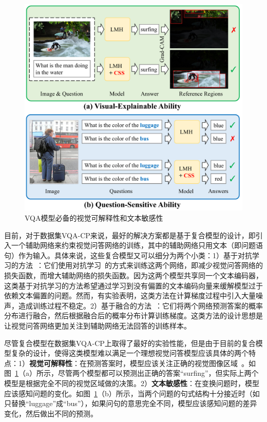 \begin{figure}[t]
    \centering
        \includegraphics[width=0.8\linewidth]{chapter7/res/motivation.pdf}
    \caption{VQA模型必备的视觉可解释性和文本敏感性}
    \label{ch7:fig:motivation}
\end{figure}

目前，对于数据集VQA-CP来说，最好的解决方案都是基于复合模型的设计，即引入一个辅助网络来约束视觉问答网络的训练，其中的辅助网络只用文本（即问题语句）作为输入。具体来说，这些复合模型又可以细分为两个小类：1）基于对抗学习的方法~\cite{ramakrishnan2018overcoming,grand2019adversarial,belinkov2019don}：它们使用对抗学习~\cite{goodfellow2014generative}的方式来训练这两个网络，即减少视觉问答网络的损失函数，而增大辅助网络的损失函数。因为这两个模型共享同一个文本编码器，这类基于对抗学习的方法希望通过学习到没有偏置的文本编码向量来缓解模型过于依赖文本偏置的问题。然而，有实验表明，这类方法在计算梯度过程中引入大量噪声，造成训练过程不稳定。2）基于融合的方法~\cite{cadene2019rubi,clark2019don,mahabadi2019simple}：它们将两个网络预测答案的概率分布进行融合，然后根据融合后的概率分布计算训练梯度。这类方法的设计思想是让视觉问答网络更加关注到辅助网络无法回答的训练样本。

尽管复合模型在数据集VQA-CP上取得了最好的实验性能，但是由于目前的复合模型复杂的设计，使得这类模型难以满足一个理想视觉问答模型应该具体的两个特点：1）\textbf{视觉可解释性}：在预测答案时，模型应该关注正确的视觉图像区域~\cite{ross2017right}。如图~\ref{ch7:fig:motivation}（a）所示，尽管两个模型都可以预测出正确的答案“surfing”，但实际上两个模型是根据完全不同的视觉区域做的决策。2）\textbf{文本敏感性}：在变换问题时，模型应该感知问题的变化。如图~\ref{ch7:fig:motivation}（b）所示，当两个问题的句式结构十分接近时（如只替换“luggage”成“bus”），如果问句的意思完全不同，模型应该感知问题的差异变化，然后做出不同的预测。

